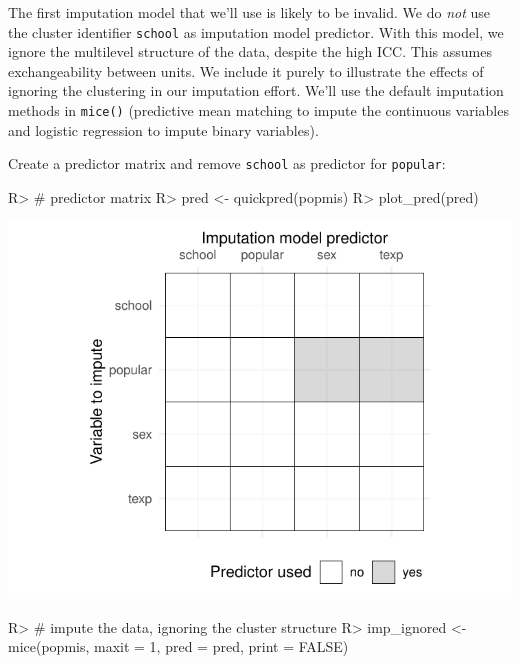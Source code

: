 \documentclass[
]{jss}
\begin{document}
The first imputation model that we'll use is likely to be invalid. We do
\emph{not} use the cluster identifier \texttt{school} as imputation
model predictor. With this model, we ignore the multilevel structure of
the data, despite the high ICC. This assumes exchangeability between
units. We include it purely to illustrate the effects of ignoring the
clustering in our imputation effort. We'll use the default imputation
methods in \texttt{mice()} (predictive mean matching to impute the
continuous variables and logistic regression to impute binary
variables).

Create a predictor matrix and remove \texttt{school} as predictor for
\texttt{popular}:

\begin{CodeChunk}
\begin{CodeInput}
R> # predictor matrix
R> pred <- quickpred(popmis)
R> plot_pred(pred)
\end{CodeInput}


\begin{center}\includegraphics{Imputation_of_Incomplete_Multilevel_Data_files/figure-latex/pop_ignored-1} \end{center}

\begin{CodeInput}
R> # impute the data, ignoring the cluster structure
R> imp_ignored <- mice(popmis, maxit = 1, pred = pred, print = FALSE)
\end{CodeInput}
\end{CodeChunk}
\end{document}
